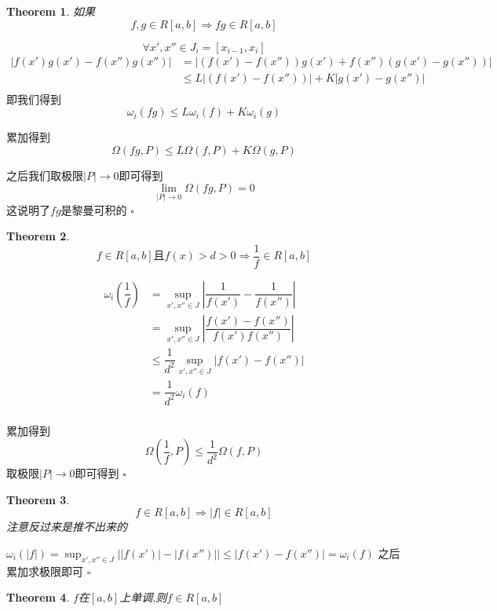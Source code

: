 \documentclass[11pt,hyperref,a4paper,UTF8]{ctexart}
\newtheorem{theorem}{Theorem}[subsection]
\newenvironment{cproof}{%
\heiti{证明}\kaishu
}{%
  \hfill $\square$
  \par\bigskip
}
\newcommand{\abs}[1]{\left|#1\right|}
\begin{document}
\begin{CJK}{UTF8}{gkai}
\begin{theorem}
  如果  \[f,g\in R[a,b] \Rightarrow fg \in R[a,b]\]
\end{theorem}

\begin{cproof}
  \[\forall x',x''\in J_i = [x_{i - 1},x_i]\]
  \[
  \begin{aligned}  
  |f(x')g(x') - f(x'')g(x'')|
  &=|(f(x')-f(x''))g(x') + f(x'')(g(x') - g(x''))|\\
  &\leq L|(f(x')-f(x''))| + K|g(x') - g(x'')|\\
  \end{aligned}
  \]
  即我们得到
  \[\omega_i(fg) \leq L\omega_i(f) + K\omega_i(g)    \]

  累加得到
  \[\Omega(fg,P) \leq L\Omega(f,P) + K\Omega(g,P)\]

  之后我们取极限$|P|\to 0$即可得到
  \[\lim_{|P|\to 0} \Omega(fg, P) = 0\]
  这说明了$fg$是黎曼可积的
\end{cproof}

\begin{theorem}
  \[f\in R[a,b] \text{且} f(x) > d > 0\Rightarrow \dfrac{1}{f} \in R[a,b]\]
\end{theorem}

\begin{cproof}
  \[
  \begin{aligned}
  \omega_i(\dfrac{1}{f}) &= \sup_{x',x''\in J}\abs{\dfrac{1}{f(x')} - \dfrac{1}{f(x'')}} \\
  &= \sup_{x',x''\in J}\abs{\dfrac{f(x') - f(x'')}{f(x')f(x'')}}\\ 
  &\leq \dfrac{1}{d^2}\sup_{x',x''\in J}|f(x') - f(x'')|\\
  &=\dfrac{1}{d^2}\omega_i(f)    \\
  \end{aligned}
  \]

  累加得到\[\Omega(\dfrac{1}{f},P) \leq  \dfrac{1}{d^2}\Omega(f,P)\]
  取极限$|P|\to 0$即可得到
\end{cproof}

\begin{theorem}
  \[f\in R[a,b] \Rightarrow |f| \in R[a,b]\]
  注意反过来是推不出来的
\end{theorem}

\begin{cproof}
  $\omega_i(|f|) = \sup_{x',x''\in J}\left||f(x')|- |f(x'')|\right| \leq |f(x') - f(x'')| = \omega_i(f)$
  之后累加求极限即可
\end{cproof}

\begin{theorem}
  $f$在$[a,b]$上单调,则$f \in R[a,b]$\\
\end{theorem}


\end{CJK}
\end{document}
